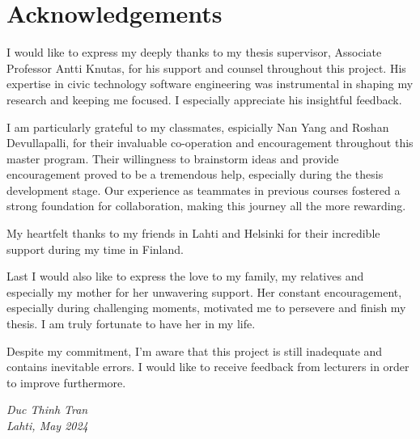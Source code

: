 \section*{Acknowledgements}

I would like to express my deeply thanks to my thesis supervisor, Associate Professor Antti Knutas, for his support and counsel throughout this project. His expertise in civic technology software engineering was instrumental in shaping my research and keeping me focused. I especially appreciate his insightful feedback.

I am particularly grateful to my classmates, espicially Nan Yang and Roshan Devullapalli, for their invaluable co-operation and encouragement throughout this master program. Their willingness to brainstorm ideas and provide encouragement proved to be a tremendous help, especially during the thesis development stage. Our experience as teammates in previous courses fostered a strong foundation for collaboration, making this journey all the more rewarding.

My heartfelt thanks to my friends in Lahti and Helsinki for their incredible support during my time in Finland.

Last I would also like to express the love to my family, my relatives and especially my mother for her unwavering support. Her constant encouragement, especially during challenging moments, motivated me to persevere and finish my thesis. I am truly fortunate to have her in my life.

Despite my commitment, I'm aware that this project is still inadequate and contains inevitable errors. I would like to receive feedback from lecturers in order to improve furthermore.

\textit{Duc Thinh Tran} \\
\textit{Lahti, May 2024}



\clearpage %

